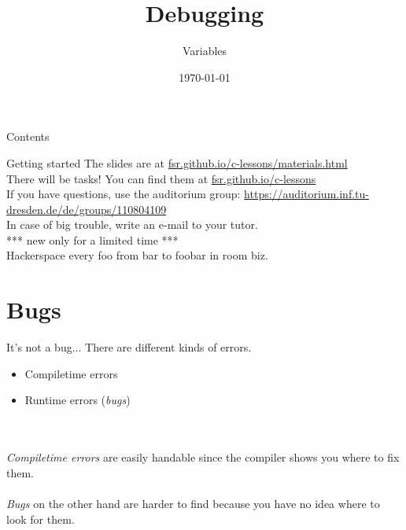 


\title{Debugging}
\subtitle{Variables}
\date{\today}





\maketitle


\begin{frame}{Contents}
	\tableofcontents
\end{frame}


\begin{frame}{Getting started}
	The slides are at \href{https://fsr.github.io/c-lessons/materials.html}{fsr.github.io/c-lessons/materials.html}\\
	\bigskip
	There will be tasks! You can find them at \href{http://fsr.github.io/c-lessons/}{fsr.github.io/c-lessons}\\
	\bigskip
	If you have questions, use the auditorium group: \href{https://auditorium.inf.tu-dresden.de/de/groups/110804109}{https://auditorium.inf.tu-dresden.de/de/groups/110804109}\\
	\bigskip
	In case of big trouble, write an e-mail to your tutor.\\
	\bigskip
	\bigskip
	*** new only for a limited time ***\\
	Hackerspace every foo from bar to foobar in room biz.
\end{frame}

\section{Bugs}

\begin{frame}{It's not a bug...}
	There are different kinds of errors.
	\begin{itemize}
		\item Compiletime errors
		\item Runtime errors (\textit{bugs})
	\end{itemize}\ \\\ \\
	\textit{Compiletime errors} are easily handable since the compiler shows you where to fix them.\\\ \\
	\textit{Bugs} on the other hand are harder to find because you have no idea where to look for them.
\end{frame}

